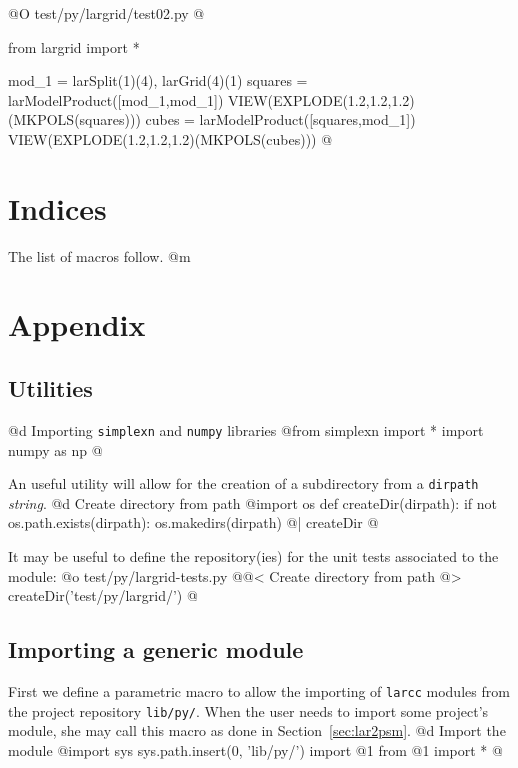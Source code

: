 \documentclass[11pt,oneside]{article}	%
\begin{document}
@O test/py/largrid/test02.py
@{from largrid import *

mod_1 = larSplit(1)(4), larGrid(4)(1)
squares = larModelProduct([mod_1,mod_1])
VIEW(EXPLODE(1.2,1.2,1.2)(MKPOLS(squares)))
cubes = larModelProduct([squares,mod_1])
VIEW(EXPLODE(1.2,1.2,1.2)(MKPOLS(cubes)))
@}


\section{Indices}
\label{sec:indices}

The list of macros follow.
@m

\appendix
\section{Appendix}
\label{sec:utilities}

\subsection{Utilities}

@d Importing \texttt{simplexn} and \texttt{numpy} libraries
@{from simplexn import *
import numpy as np
@}

An useful utility will allow for the creation of a subdirectory from a \texttt{dirpath} \emph{string}.
@d Create directory from path 
@{import os
def createDir(dirpath):
    if not os.path.exists(dirpath):
        os.makedirs(dirpath)
@| createDir @}

It may be useful to define the repository(ies) for the unit tests associated to the module:
@o test/py/largrid-tests.py
@{@< Create directory from path @>
createDir('test/py/largrid/')
@}

\subsection{Importing a generic module}
First we define a parametric macro to allow the importing of \texttt{larcc} modules from the project repository \texttt{lib/py/}. When the user needs to import some project's module, she may call this macro as done in Section~\ref{sec:lar2psm}.
@d Import the module
@{import sys
sys.path.insert(0, 'lib/py/')
import @1
from @1 import *
@}
\end{document}
